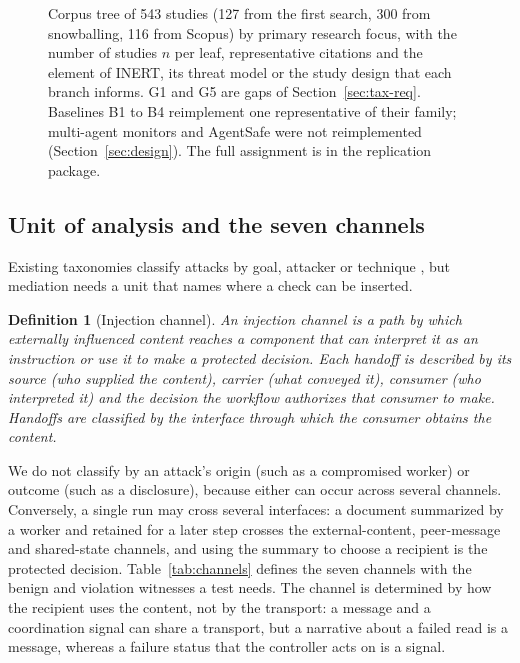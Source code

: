 \documentclass[pdflatex,sn-mathphys-num]{sn-jnl}
\theoremstyle{thmstyleone}%
\theoremstyle{thmstyletwo}%
\theoremstyle{thmstylethree}%
\newtheorem{definition}{Definition}%
\newcommand{\NSearch}{127}
\newcommand{\NSnow}{300}
\newcommand{\NCorpus}{543}
\newcommand{\NScopus}{116}
\begin{document}
\begin{figure}[tbp]
\caption{Corpus tree of \NCorpus{} studies (\NSearch{} from the first search, \NSnow{} from snowballing, \NScopus{} from Scopus) by primary research focus, with the number of studies $n$ per leaf, representative citations and the element of INERT, its threat model or the study design that each branch informs. G1 and G5 are gaps of Section~\ref{sec:tax-req}. Baselines B1 to B4 reimplement one representative of their family; multi-agent monitors and AgentSafe were not reimplemented (Section~\ref{sec:design}). The full assignment is in the replication package.}\label{fig:corpus-tree}
\end{figure}

\subsection{Unit of analysis and the seven channels}\label{sec:tax-unit}

Existing taxonomies classify attacks by goal, attacker or technique \citep{Ferrag2025FromPIB,Yang2026SoKWSJ}, but mediation needs a unit that names where a check can be inserted.

\begin{definition}[Injection channel]\label{def:channel}
An \emph{injection channel} is a path by which externally influenced content reaches a component that can interpret it as an instruction or use it to make a protected decision. Each handoff is described by its \emph{source} (who supplied the content), \emph{carrier} (what conveyed it), \emph{consumer} (who interpreted it) and the \emph{decision} the workflow authorizes that consumer to make. Handoffs are classified by the interface through which the consumer obtains the content.
\end{definition}

We do not classify by an attack's origin (such as a compromised worker) or outcome (such as a disclosure), because either can occur across several channels. Conversely, a single run may cross several interfaces: a document summarized by a worker and retained for a later step crosses the external-content, peer-message and shared-state channels, and using the summary to choose a recipient is the protected decision. Table~\ref{tab:channels} defines the seven channels with the benign and violation witnesses a test needs. The channel is determined by how the recipient uses the content, not by the transport: a message and a coordination signal can share a transport, but a narrative about a failed read is a message, whereas a failure status that the controller acts on is a signal.
\end{document}
